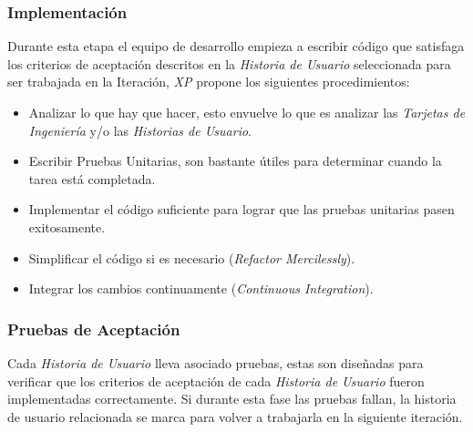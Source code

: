              \subsubsection{Implementación}

            Durante esta etapa el equipo de desarrollo empieza a escribir código que satisfaga los criterios de aceptación descritos en la \emph{Historia de Usuario} seleccionada para ser trabajada en la Iteración, \emph{XP} propone los siguientes procedimientos:


              \begin{itemize}
                \item Analizar lo que hay que hacer, esto envuelve lo que es analizar las \emph{Tarjetas de Ingeniería} y/o las \emph{Historias de Usuario}. %

                \item Escribir Pruebas Unitarias, son bastante útiles para determinar cuando la tarea está completada.

                \item Implementar el código suficiente para lograr que las pruebas unitarias pasen exitosamente.

                \item Simplificar el código si es necesario (\emph{Refactor Mercilessly}).

                \item Integrar los cambios continuamente (\emph{Continuous Integration}).

              \end{itemize}

\subsubsection{Pruebas de Aceptación}
              Cada \emph{Historia de Usuario} lleva asociado pruebas, estas son diseñadas para verificar que los criterios de aceptación de cada \emph{Historia de Usuario} fueron implementadas correctamente. Si durante esta fase las pruebas fallan, la historia de usuario relacionada se marca para volver a trabajarla en la siguiente iteración.\\


